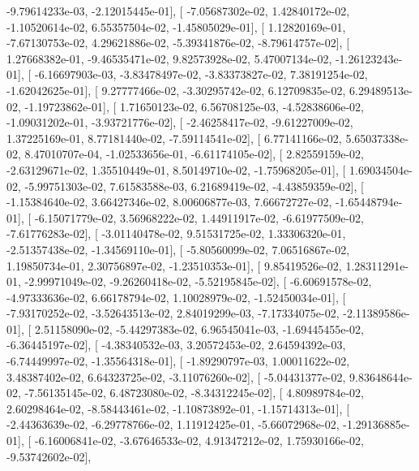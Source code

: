 \documentclass{article}
\begin{document}
         -9.79614233e-03,  -2.12015445e-01],
       [ -7.05687302e-02,   1.42840172e-02,  -1.10520614e-02,
          6.55357504e-02,  -1.45805029e-01],
       [  1.12820169e-01,  -7.67130753e-02,   4.29621886e-02,
         -5.39341876e-02,  -8.79614757e-02],
       [  1.27668382e-01,  -9.46535471e-02,   9.82573928e-02,
          5.47007134e-02,  -1.26123243e-01],
       [ -6.16697903e-03,  -3.83478497e-02,  -3.83373827e-02,
          7.38191254e-02,  -1.62042625e-01],
       [  9.27777466e-02,  -3.30295742e-02,   6.12709835e-02,
          6.29489513e-02,  -1.19723862e-01],
       [  1.71650123e-02,   6.56708125e-03,  -4.52838606e-02,
         -1.09031202e-01,  -3.93721776e-02],
       [ -2.46258417e-02,  -9.61227009e-02,   1.37225169e-01,
          8.77181440e-02,  -7.59114541e-02],
       [  6.77141166e-02,   5.65037338e-02,   8.47010707e-04,
         -1.02533656e-01,  -6.61174105e-02],
       [  2.82559159e-02,  -2.63129671e-02,   1.35510449e-01,
          8.50149710e-02,  -1.75968205e-01],
       [  1.69034504e-02,  -5.99751303e-02,   7.61583588e-03,
          6.21689419e-02,  -4.43859359e-02],
       [ -1.15384640e-02,   3.66427346e-02,   8.00606877e-03,
          7.66672727e-02,  -1.65448794e-01],
       [ -6.15071779e-02,   3.56968222e-02,   1.44911917e-02,
         -6.61977509e-02,  -7.61776283e-02],
       [ -3.01140478e-02,   9.51531725e-02,   1.33306320e-01,
         -2.51357438e-02,  -1.34569110e-01],
       [ -5.80560099e-02,   7.06516867e-02,   1.19850734e-01,
          2.30756897e-02,  -1.23510353e-01],
       [  9.85419526e-02,   1.28311291e-01,  -2.99971049e-02,
         -9.26260418e-02,  -5.52195845e-02],
       [ -6.60691578e-02,  -4.97333636e-02,   6.66178794e-02,
          1.10028979e-02,  -1.52450034e-01],
       [ -7.93170252e-02,  -3.52643513e-02,   2.84019299e-03,
         -7.17334075e-02,  -2.11389586e-01],
       [  2.51158090e-02,  -5.44297383e-02,   6.96545041e-03,
         -1.69445455e-02,  -6.36445197e-02],
       [ -4.38340532e-03,   3.20572453e-02,   2.64594392e-03,
         -6.74449997e-02,  -1.35564318e-01],
       [ -1.89290797e-03,   1.00011622e-02,   3.48387402e-02,
          6.64323725e-02,  -3.11076260e-02],
       [ -5.04431377e-02,   9.83648644e-02,  -7.56135145e-02,
          6.48723080e-02,  -8.34312245e-02],
       [  4.80989784e-02,   2.60298464e-02,  -8.58443461e-02,
         -1.10873892e-01,  -1.15714313e-01],
       [ -2.44363639e-02,  -6.29778766e-02,   1.11912425e-01,
         -5.66072968e-02,  -1.29136885e-01],
       [ -6.16006841e-02,  -3.67646533e-02,   4.91347212e-02,
          1.75930166e-02,  -9.53742602e-02],
\end{document}
